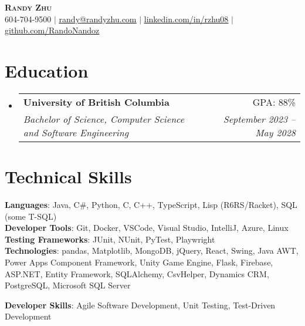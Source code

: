 \documentclass[letterpaper,11pt]{article}
\makeatletter
\newcommand{\resumeSubheading}[4]{
  \vspace{-2pt}\item
    \begin{tabular*}{0.97\textwidth}[t]{l@{\extracolsep{\fill}}r}
      \textbf{#1} & #2 \\
      \textit{\small#3} & \textit{\small #4} \\
    \end{tabular*}\vspace{-7pt}
}
\newcommand{\resumeSubHeadingListStart}{\begin{itemize}[leftmargin=0.15in, label={}]}
\newcommand{\resumeSubHeadingListEnd}{\end{itemize}}
\makeatother
\begin{document}

\begin{center}
  \textbf{\Huge \scshape Randy Zhu} \\ \vspace{1pt}
  \small 604-704-9500 $|$ \href{mailto:randy@randyzhu.com}{\underline{randy@randyzhu.com}} $|$
  \href{https://www.linkedin.com/in/rzhu08/}{\underline{linkedin.com/in/rzhu08}} $|$
  \href{https://github.com/RandoNandoz}{\underline{github.com/RandoNandoz}}
\end{center}

\section{Education}
\resumeSubHeadingListStart
\resumeSubheading
{University of British Columbia}{GPA: 88\%}
{Bachelor of Science, Computer Science and Software Engineering}{September 2023 -- May 2028}
\resumeSubHeadingListEnd

%
\section{Technical Skills}
\begin{itemize}[leftmargin=0.15in, label={}]
  \small{\item{
        \textbf{Languages}{: Java, C\#, Python, C, C++, TypeScript, Lisp (R6RS/Racket), SQL (some T-SQL)} \\
        \textbf{Developer Tools}{: Git, Docker, VSCode, Visual Studio, IntelliJ, Azure, Linux} \\
        \textbf{Testing Frameworks}{: JUnit, NUnit, PyTest, Playwright} \\
        \textbf{Technologies}{:
          pandas, Matplotlib, MongoDB, jQuery, React, Swing, Java AWT,
          Power Apps Component Framework, Unity Game Engine, Flask, Firebase,
          ASP.NET, Entity Framework, SQLAlchemy, CsvHelper, Dynamics CRM, PostgreSQL, Microsoft SQL Server
        } \\}}
        \textbf{Developer Skills}{: Agile Software Development, Unit Testing, Test-Driven Development }
\end{itemize}
\end{document}
